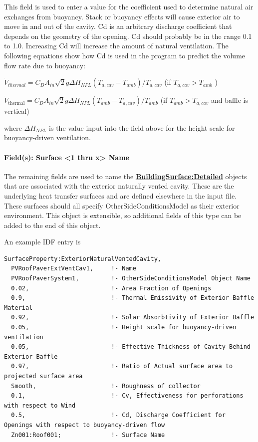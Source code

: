 This field is used to enter a value for the coefficient used to determine natural air exchanges from buoyancy. Stack or buoyancy effects will cause exterior air to move in and out of the cavity. Cd is an arbitrary discharge coefficient that depends on the geometry of the opening. Cd should probably be in the range 0.1 to 1.0. Increasing Cd will increase the amount of natural ventilation. The following equations show how Cd is used in the program to predict the volume flow rate due to buoyancy:

\(\dot{V}_{thermal} = C_D A_{in} \sqrt 2 g \Delta H_{NPL} \left( T_{a,cav} - T_{amb} \right) / T_{a,cav}\) (if \(T_{a,cav} > T_{amb}\) )

\(\dot{V}_{\text{thermal}} = C_D A_{in} \sqrt 2 g \Delta H_{NPL} \left( T_{amb} - T_{a,cav} \right) / T_{amb}\) (if \(T_{amb} > T_{a,cav}\) and baffle is vertical)

where \(\Delta {H_{NPL}}\) is the value input into the field above for the height scale for buoyancy-driven ventilation.

\paragraph{Field(s): Surface \textless{}1 thru x\textgreater{} Name}\label{fields-surface-1-thru-x-name}

The remaining fields are used to name the \textbf{\hyperref[buildingsurfacedetailed]{BuildingSurface:Detailed}} objects that are associated with the exterior naturally vented cavity. These are the underlying heat transfer surfaces and are defined elsewhere in the input file. These surfaces should all specify OtherSideConditionsModel as their exterior environment. This object is extensible, so additional fields of this type can be added to the end of this object.

An example IDF entry is

\begin{lstlisting}
SurfaceProperty:ExteriorNaturalVentedCavity,
  PVRoofPaverExtVentCav1,     !- Name
  PVRoofPaverSystem1,         !- OtherSideConditionsModel Object Name
  0.02,                       !- Area Fraction of Openings
  0.9,                        !- Thermal Emissivity of Exterior Baffle Material
  0.92,                       !- Solar Absorbtivity of Exterior Baffle
  0.05,                       !- Height scale for buoyancy-driven ventilation
  0.05,                       !- Effective Thickness of Cavity Behind Exterior Baffle
  0.97,                       !- Ratio of Actual surface area to projected surface area
  Smooth,                     !- Roughness of collector
  0.1,                        !- Cv, Effectiveness for perforations with respect to Wind
  0.5,                        !- Cd, Discharge Coefficient for Openings with respect to buoyancy-driven flow
  Zn001:Roof001;              !- Surface Name
\end{lstlisting}

